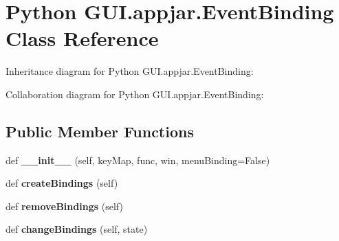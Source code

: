 \hypertarget{class_python_01_g_u_i_1_1appjar_1_1_event_binding}{}\section{Python G\+U\+I.\+appjar.\+Event\+Binding Class Reference}
\label{class_python_01_g_u_i_1_1appjar_1_1_event_binding}


Inheritance diagram for Python G\+U\+I.\+appjar.\+Event\+Binding\+:


Collaboration diagram for Python G\+U\+I.\+appjar.\+Event\+Binding\+:
\subsection*{Public Member Functions}
\begin{DoxyCompactItemize}
\item 
\mbox{\label{class_python_01_g_u_i_1_1appjar_1_1_event_binding_a58312fcda3e4715264e71461076f8d05}} 
def {\bfseries \+\_\+\+\_\+init\+\_\+\+\_\+} (self, key\+Map, func, win, menu\+Binding=False)
\item 
\mbox{\label{class_python_01_g_u_i_1_1appjar_1_1_event_binding_aac5fee792646de7426051e12e924aa8c}} 
def {\bfseries create\+Bindings} (self)
\item 
\mbox{\label{class_python_01_g_u_i_1_1appjar_1_1_event_binding_a84c7dfde5f7262f3cd94fdabd671968d}} 
def {\bfseries remove\+Bindings} (self)
\item 
\mbox{\label{class_python_01_g_u_i_1_1appjar_1_1_event_binding_aa3e7b5f67d3ab86baf641483261c10b9}} 
def {\bfseries change\+Bindings} (self, state)
\end{DoxyCompactItemize}
